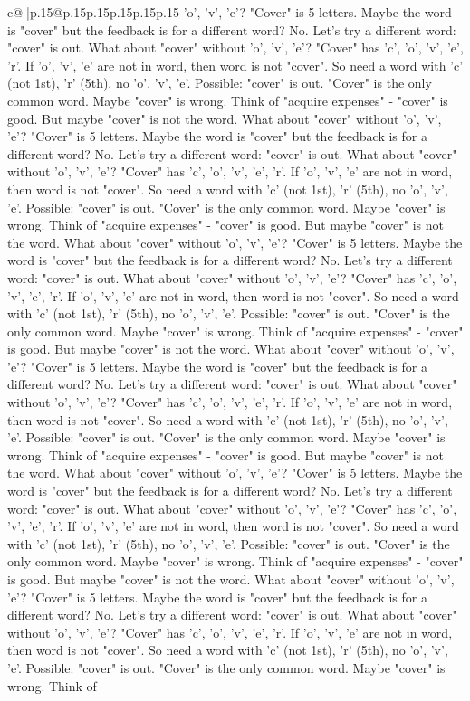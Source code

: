 \documentclass{article}
\begin{document}
{\begin{supertabular}{c@{$\;$}|p{.15\linewidth}@{}p{.15\linewidth}p{.15\linewidth}p{.15\linewidth}p{.15\linewidth}p{.15\linewidth}}
{{{'o', 'v', 'e'? "Cover" is 5 letters. Maybe the word is "cover" but the feedback is for a different word? No. Let's try a different word: "cover" is out. What about "cover" without 'o', 'v', 'e'? "Cover" has 'c', 'o', 'v', 'e', 'r'. If 'o', 'v', 'e' are not in word, then word is not "cover". So need a word with 'c' (not 1st), 'r' (5th), no 'o', 'v', 'e'. Possible: "cover" is out. "Cover" is the only common word. Maybe "cover" is wrong. Think of "acquire expenses" {-} "cover" is good. But maybe "cover" is not the word. What about "cover" without 'o', 'v', 'e'? "Cover" is 5 letters. Maybe the word is "cover" but the feedback is for a different word? No. Let's try a different word: "cover" is out. What about "cover" without 'o', 'v', 'e'? "Cover" has 'c', 'o', 'v', 'e', 'r'. If 'o', 'v', 'e' are not in word, then word is not "cover". So need a word with 'c' (not 1st), 'r' (5th), no 'o', 'v', 'e'. Possible: "cover" is out. "Cover" is the only common word. Maybe "cover" is wrong. Think of "acquire expenses" {-} "cover" is good. But maybe "cover" is not the word. What about "cover" without 'o', 'v', 'e'? "Cover" is 5 letters. Maybe the word is "cover" but the feedback is for a different word? No. Let's try a different word: "cover" is out. What about "cover" without 'o', 'v', 'e'? "Cover" has 'c', 'o', 'v', 'e', 'r'. If 'o', 'v', 'e' are not in word, then word is not "cover". So need a word with 'c' (not 1st), 'r' (5th), no 'o', 'v', 'e'. Possible: "cover" is out. "Cover" is the only common word. Maybe "cover" is wrong. Think of "acquire expenses" {-} "cover" is good. But maybe "cover" is not the word. What about "cover" without 'o', 'v', 'e'? "Cover" is 5 letters. Maybe the word is "cover" but the feedback is for a different word? No. Let's try a different word: "cover" is out. What about "cover" without 'o', 'v', 'e'? "Cover" has 'c', 'o', 'v', 'e', 'r'. If 'o', 'v', 'e' are not in word, then word is not "cover". So need a word with 'c' (not 1st), 'r' (5th), no 'o', 'v', 'e'. Possible: "cover" is out. "Cover" is the only common word. Maybe "cover" is wrong. Think of "acquire expenses" {-} "cover" is good. But maybe "cover" is not the word. What about "cover" without 'o', 'v', 'e'? "Cover" is 5 letters. Maybe the word is "cover" but the feedback is for a different word? No. Let's try a different word: "cover" is out. What about "cover" without 'o', 'v', 'e'? "Cover" has 'c', 'o', 'v', 'e', 'r'. If 'o', 'v', 'e' are not in word, then word is not "cover". So need a word with 'c' (not 1st), 'r' (5th), no 'o', 'v', 'e'. Possible: "cover" is out. "Cover" is the only common word. Maybe "cover" is wrong. Think of "acquire expenses" {-} "cover" is good. But maybe "cover" is not the word. What about "cover" without 'o', 'v', 'e'? "Cover" is 5 letters. Maybe the word is "cover" but the feedback is for a different word? No. Let's try a different word: "cover" is out. What about "cover" without 'o', 'v', 'e'? "Cover" has 'c', 'o', 'v', 'e', 'r'. If 'o', 'v', 'e' are not in word, then word is not "cover". So need a word with 'c' (not 1st), 'r' (5th), no 'o', 'v', 'e'. Possible: "cover" is out. "Cover" is the only common word. Maybe "cover" is wrong. Think of }}}
\end{supertabular}}
\end{document}
